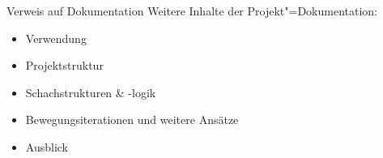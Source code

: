 \begin{frame}{Verweis auf Dokumentation}
    Weitere Inhalte der Projekt"=Dokumentation:

    \begin{itemize}
        \item Verwendung
        \item Projektstruktur
        \item Schachstrukturen \& -logik
        \item Bewegungsiterationen und weitere Ansätze
        \item Ausblick
    \end{itemize}
\end{frame}
